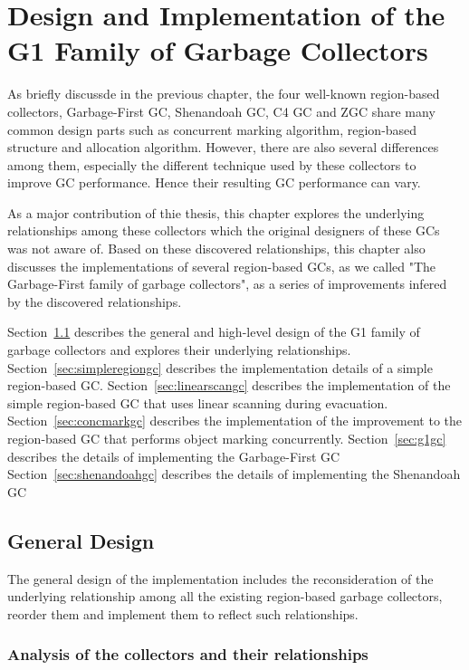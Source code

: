 \chapter{Design and Implementation of the G1 Family of Garbage Collectors}
\label{cha:implementation}

As briefly discussde in the previous chapter, the four well-known region-based collectors, Garbage-First GC, Shenandoah GC, C4 GC and
ZGC share many common design parts such as concurrent marking algorithm, region-based
structure and allocation algorithm. However, there are also several differences
among them, especially the different technique used by these collectors to improve GC performance.
Hence their resulting GC performance can vary.

As a major contribution of thie thesis, this chapter explores the underlying relationships
among these collectors which the original designers of these GCs was not aware of.
Based on these discovered relationships, this chapter also discusses the implementations
of several region-based GCs, as we called "The Garbage-First family of garbage collectors",
as a series of improvements infered by the discovered relationships.

Section~\ref{sec:generaldesign} describes the general and high-level design of the
G1 family of garbage collectors and explores their underlying relationships.
Section~\ref{sec:simpleregiongc} describes the implementation details of a simple region-based GC.
Section~\ref{sec:linearscangc} describes the implementation of the simple region-based GC that uses linear scanning during evacuation.
Section~\ref{sec:concmarkgc} describes the implementation of the improvement to the region-based GC that performs object marking concurrently.
Section~\ref{sec:g1gc} describes the details of implementing the Garbage-First GC
Section~\ref{sec:shenandoahgc} describes the details of implementing the Shenandoah GC



\section{General Design}
\label{sec:generaldesign}

The general design of the implementation includes the reconsideration of the underlying
relationship among all the existing region-based garbage collectors, reorder them
and implement them to reflect such relationships.

\subsection{Analysis of the collectors and their relationships}

